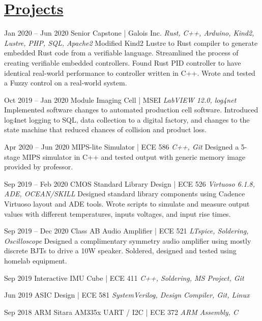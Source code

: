 \documentclass[letterpaper]{moderncv}        %
\begin{document}
\section{\underline{Projects}}
\cventry
{Jan 2020 -- Jun 2020}
{Senior Capstone | Galois Inc.}
{}
{\textit{Rust, C++, Arduino, Kind2, Lustre, PHP, SQL, Apache2}}
{}
{Modified Kind2 Lustre to Rust compiler to generate embedded Rust code from a verifiable language.  Streamlined the process of creating verifiable embedded controllers.  Found Rust PID controller to have identical real-world performance to controller written in C++.  Wrote and tested a Fuzzy control on a real-world system.\\}
	
\cventry
{Oct 2019 -- Jan 2020}
{Module Imaging Cell | MSEI}
{}
{\textit{LabVIEW 12.0, log4net}}
{}
{Implemented software changes to automated production cell software.  Introduced log4net logging to SQL, data collection to a digital factory, and changes to the state machine that reduced chances of collision and product loss.\\}

\cventry
{Apr 2020 -- Jun 2020}
{MIPS-lite Simulator | ECE 586}
{}
{\textit{C++, Git}}
{}
{Designed a 5-stage MIPS simulator in C++ and tested output with generic memory image provided by professor.\\}

\cventry
{Sep 2019 -- Feb 2020}
{CMOS Standard Library Design | ECE 526}
{}
{\textit{Virtuoso 6.1.8, ADE, OCEAN/SKILL}}
{}
{Designed standard library components using Cadence Virtuoso layout and ADE tools.  Wrote scripts to simulate and measure output values with different temperatures, inputs voltages, and input rise times.\\}	

\cventry
{Sep 2019 -- Dec 2020}
{Class AB Audio Amplifier | ECE 521}
{}
{\textit{LTspice, Soldering, Oscilloscope}}
{}
{Designed a complimentary symmetry audio amplifier using mostly discrete BJTs to drive a 10W speaker.  Soldered, designed and tested using homelab equipment.\\}	

\cventry
{Sep 2019}
{Interactive IMU Cube | ECE 411}
{}
{\textit{C++, Soldering, MS Project, Git}}
{}
{}	

	


\cventry
{Jun 2019}
{ASIC Design | ECE 581}
{}
{\textit{SystemVerilog, Design Compiler, Git, Linux}}
{}
{}
	
	
\cventry
{Sep 2018}
{ARM Sitara AM335x UART / I2C | ECE 372}
{}
{\textit{ARM Assembly, C}}
{}
{}			
\end{document}
